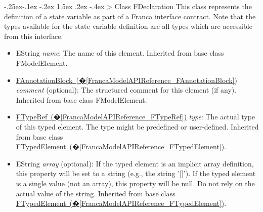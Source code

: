 \documentclass[a4paper,10pt]{scrreprt}
\makeatletter
\renewcommand\subsection{\medskip\@startsection{subsection}{2}{\z@}%
  {-.25ex\@plus -.1ex \@minus -.2ex}%
  {1.5ex \@plus .2ex \@minus -.4ex}%
  {\ifnum \scr@compatibility>\@nameuse{scr@v@2.96}\relax
    \setlength{\parfillskip}{\z@ plus 1fil}\fi
    \raggedsection\normalfont\sectfont\nobreak\size@subsection
  }%
}
\newlength{\XdocItemIndent}
\makeatother
\begin{document}
\subsection{Class FDeclaration}
\label{FrancaModelAPIReference_FDeclaration}
This class represents the definition of a state variable
as part of a Franca interface contract. Note that the 
types available for the state variable definition are 
all types which are accessible from this interface.
\setlength{\XdocItemIndent}{\textwidth}
\begin{itemize}
\addtolength{\XdocItemIndent}{-2.5em}
\item \begin{minipage}[t]{\XdocItemIndent}
EString \textit{name}: The name of this element.
		 Inherited from base class FModelElement.

\end{minipage}
\item \begin{minipage}[t]{\XdocItemIndent}
\hyperref[FrancaModelAPIReference_FAnnotationBlock]{FAnnotationBlock~(�\ref*{FrancaModelAPIReference_FAnnotationBlock})} \textit{comment} (optional): The structured comment for this element (if any).
		 Inherited from base class FModelElement.

\end{minipage}
\item \begin{minipage}[t]{\XdocItemIndent}
\hyperref[FrancaModelAPIReference_FTypeRef]{FTypeRef~(�\ref*{FrancaModelAPIReference_FTypeRef})} \textit{type}: The actual type of this typed element. The type might be predefined or user-defined.
		 Inherited from base class \hyperref[FrancaModelAPIReference_FTypedElement]{FTypedElement~(�\ref*{FrancaModelAPIReference_FTypedElement})}.

\end{minipage}
\item \begin{minipage}[t]{\XdocItemIndent}
EString \textit{array} (optional): If the typed element is an implicit array definition, this property will be set to a string (e.g., the string '[]'). If the typed element is a single value (not an array), this property will be null. Do not rely on the actual value of the string.
		 Inherited from base class \hyperref[FrancaModelAPIReference_FTypedElement]{FTypedElement~(�\ref*{FrancaModelAPIReference_FTypedElement})}.

\end{minipage}
\end{itemize}
\addtolength{\XdocItemIndent}{2.5em}
\end{document}
